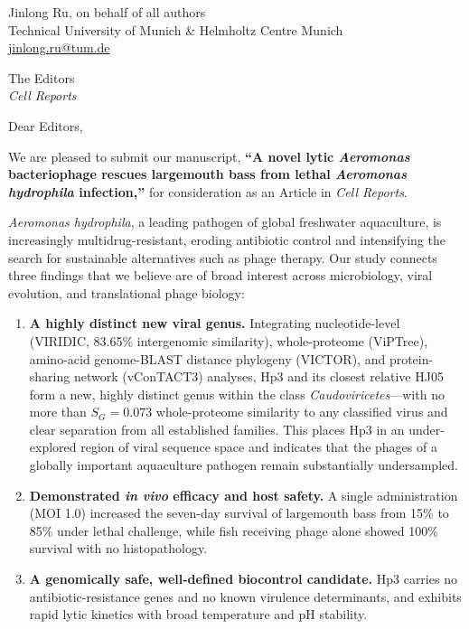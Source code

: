 \documentclass[11pt,a4paper]{article}
\begin{document}
\noindent Jinlong Ru, on behalf of all authors\\
Technical University of Munich \& Helmholtz Centre Munich\\
\href{mailto:jinlong.ru@tum.de}{jinlong.ru@tum.de}

\bigskip
\noindent The Editors\\
\emph{Cell Reports}

\bigskip
\noindent Dear Editors,

We are pleased to submit our manuscript, \textbf{``A novel lytic
\emph{Aeromonas} bacteriophage rescues largemouth bass from lethal
\emph{Aeromonas hydrophila} infection,''} for consideration as an Article in
\emph{Cell Reports}.

\emph{Aeromonas hydrophila}, a leading pathogen of global freshwater
aquaculture, is increasingly multidrug-resistant, eroding antibiotic control
and intensifying the search for sustainable alternatives such as phage therapy.
Our study connects three findings that we believe are of broad interest across
microbiology, viral evolution, and translational phage biology:

\begin{enumerate}
\item \textbf{A highly distinct new viral genus.} Integrating nucleotide-level
(VIRIDIC, 83.65\% intergenomic similarity), whole-proteome (ViPTree),
amino-acid genome-BLAST distance phylogeny (VICTOR), and protein-sharing
network (vConTACT3) analyses, Hp3 and its closest relative HJ05 form a new,
highly distinct genus within the class \emph{Caudoviricetes}---with no more
than $S_G = 0.073$ whole-proteome similarity to any classified virus and clear
separation from all established families. This places Hp3 in an
under-explored region of viral sequence space and indicates that the phages of
a globally important aquaculture pathogen remain substantially undersampled.

\item \textbf{Demonstrated \emph{in vivo} efficacy and host safety.} A single
administration (MOI 1.0) increased the seven-day survival of largemouth bass
from 15\% to 85\% under lethal challenge, while fish receiving phage alone
showed 100\% survival with no histopathology.

\item \textbf{A genomically safe, well-defined biocontrol candidate.} Hp3
carries no antibiotic-resistance genes and no known virulence
determinants, and exhibits rapid lytic kinetics with broad temperature and pH
stability.

\end{enumerate}
\end{document}
